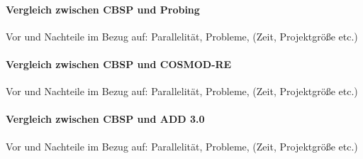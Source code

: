 \paragraph{Vergleich zwischen CBSP und Probing}
Vor und Nachteile im Bezug auf: Parallelität, Probleme, (Zeit, Projektgröße etc.)\\

\paragraph{Vergleich zwischen CBSP und  COSMOD-RE}
Vor und Nachteile im Bezug auf: Parallelität, Probleme, (Zeit, Projektgröße etc.)\\

\paragraph{Vergleich zwischen CBSP und ADD 3.0}
Vor und Nachteile im Bezug auf: Parallelität, Probleme, (Zeit, Projektgröße etc.)\\